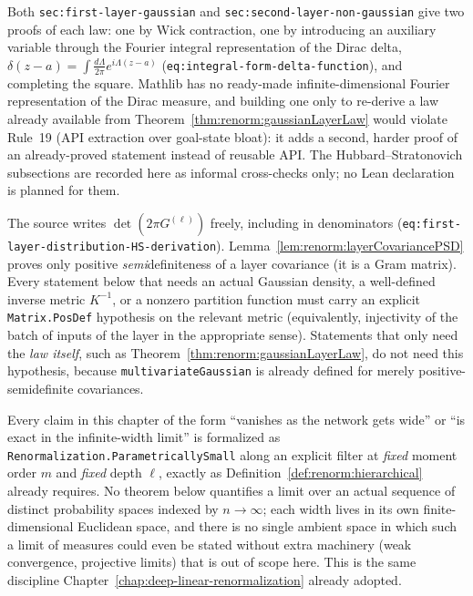 \begin{remark}
Both \texttt{sec:first-layer-gaussian} and \texttt{sec:second-layer-non-gaussian} give two proofs of
each law: one by Wick contraction, one by introducing an auxiliary variable through the Fourier
integral representation of the Dirac delta,
$\delta(z-a)=\int\frac{d\Lambda}{2\pi}e^{i\Lambda(z-a)}$ (\texttt{eq:integral-form-delta-function}),
and completing the square.  Mathlib has no ready-made infinite-dimensional Fourier representation
of the Dirac measure, and building one only to re-derive a law already available from
Theorem~\ref{thm:renorm:gaussianLayerLaw} would violate Rule~19 (API extraction over goal-state
bloat): it adds a second, harder proof of an already-proved statement instead of reusable API.  The
Hubbard--Stratonovich subsections are recorded here as informal cross-checks only; no Lean
declaration is planned for them.
\end{remark}

\begin{remark}
The source writes $\det(2\pi G^{(\ell)})$ freely, including in denominators
(\texttt{eq:first-layer-distribution-HS-derivation}). Lemma~\ref{lem:renorm:layerCovariancePSD}
proves only positive \emph{semi}definiteness of a layer covariance (it is a Gram matrix). Every
statement below that needs an actual Gaussian density, a well-defined inverse metric $K^{-1}$, or a
nonzero partition function must carry an explicit \texttt{Matrix.PosDef} hypothesis on the relevant
metric (equivalently, injectivity of the batch of inputs of the layer in the appropriate sense).
Statements that only need the \emph{law itself}, such as Theorem~\ref{thm:renorm:gaussianLayerLaw},
do not need this hypothesis, because \texttt{multivariateGaussian} is already defined for
merely positive-semidefinite covariances.
\end{remark}

\begin{remark}
Every claim in this chapter of the form ``vanishes as the network gets wide'' or ``is exact in the
infinite-width limit'' is formalized as \texttt{Renormalization.ParametricallySmall} along an
explicit filter at \emph{fixed} moment order $m$ and \emph{fixed} depth $\ell$, exactly as
Definition~\ref{def:renorm:hierarchical} already requires. No theorem below quantifies a limit over
an actual sequence of distinct probability spaces indexed by $n\to\infty$; each width lives in its
own finite-dimensional Euclidean space, and there is no single ambient space in which such a limit
of measures could even be stated without extra machinery (weak convergence, projective limits)
that is out of scope here. This is the same discipline Chapter~\ref{chap:deep-linear-renormalization}
already adopted.
\end{remark}

